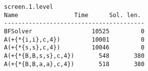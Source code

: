 \begin{verbatim}
		screen.1.level
		Name                Time      Sol. len. 
		----------------------------------------
		BFSolver                 10525         0
		A(+{*{i,i},c,4})         10001         0
		A(+{*{s,s},c,4})         10046         0
		A(+{*{B,B,s,s},c,4})       548       380
		A(+{*{B,B,a,a},c,4})       518       380
\end{verbatim}





